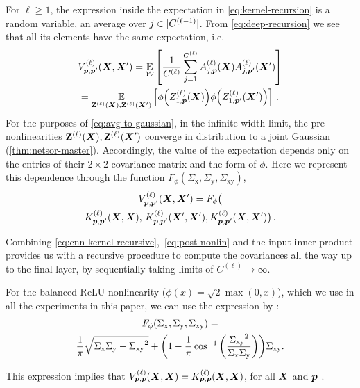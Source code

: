 \documentclass[accepted]{uai2021} %
\newcommand{\Sigmax}{{\Sigma_{\text{x}}}}
\newcommand{\Sigmay}{{\Sigma_{\text{y}}}}
\newcommand{\Sigmaxy}{{\Sigma_{\text{xy}}}}
\newcommand{\layerAd}[2]{\mathbf{Z}^{(#1)}_{#2}(\vX')}
\newcommand{\layerAsd}[2]{Z^{(#1)}_{#2}(\vX')}
\newcommand{\layerAs}[2]{Z^{(#1)}_{#2}(\vX)}
\newcommand{\layerA}[2]{\mathbf{Z}^{(#1)}_{#2}(\mX)}
\newcommand{\layerC}[1]{C^{(#1)}}
\newcommand{\layerNLAsd}[2]{A^{(#1)}_{#2}(\vX')}
\newcommand{\layerNLAs}[2]{A^{(#1)}_{#2}(\vX)}
\newcommand{\prevchan}{j}   %
\newcommand{\patch}{\vp}               %
\newcommand{\covf}[1]{K\ssup{#1}}
\newcommand{\nlinf}[1]{V\ssup{#1}}
\newcommand{\0}{\boldsymbol{0}}
\newcommand{\1}{\boldsymbol{1}}
\newcommand{\crefp}[1]{(\cref{#1})}
\begin{document}
For $\ell\ge 1$, the expression inside the expectation in \cref{eq:kernel-recursion} is a random variable, an average over $\prevchan\in\countto{\layerC{\ell-1}}$. From \cref{eq:deep-recursion} we see that all its elements have the same expectation, i.e.
\begin{multline}
\nlinf{\ell}_{\patch,\patch'}\bra{\mX,\mX'}
= \Expect{\gW}{\frac{1}{\layerC{\ell}} \sum_{\prevchan=1}^{\layerC{\ell}} \layerNLAs{\ell}{\prevchan,\patch} \layerNLAsd{\ell}{\prevchan,\patch'}} \\
= \Expect{ \layerA{\ell}{}, \layerAd{\ell}{} }{\phi\bra{\layerAs{\ell}{1,\patch}} \phi\bra{\layerAsd{\ell}{1,\patch'}}}\,.
\label{eq:avg-to-gaussian}
\end{multline}
For the purposes of \cref{eq:avg-to-gaussian}, in the infinite width limit, the
pre-nonlinearities $\layerA{\ell}{},\layerAd{\ell}{}$ converge in distribution to a joint Gaussian
\crefp{thm:netsor-master}. Accordingly, the value of the expectation depends only on the entries of their $2\times 2$ covariance matrix and the form of $\phi$. Here we represent this dependence through the function $F_{\phi}(\Sigmax, \Sigmay, \Sigmaxy)$,
\begin{multline}
\nlinf{\ell}_{\patch,\patch'}\bra{\mX,\mX'}
=F_{\phi}\big(\\
\covf{\ell}_{\patch,\patch'}\bra{\mX, \mX},\,\covf{\ell}_{\patch,\patch'}\bra{\mX', \mX'},
\covf{\ell}_{\patch,\patch'}\bra{\mX, \mX'}\big)\,.
\label{eq:post-nonlin}
\end{multline}

Combining \cref{eq:cnn-kernel-recursive},~\ref{eq:post-nonlin} and the input inner product
provides us with a recursive procedure to compute the covariances all the way up to the final layer, by sequentially taking limits of $\layerC\ell\to\infty$. %

For the balanced ReLU nonlinearity ($\phi(x) = \sqrt{2}\max(0, x)$), which we
use in all the experiments in this paper, we can use the expression by \citet{cho2009mkm}:
\begin{multline}
  F_{\phi}\bra{\Sigmax, \Sigmay, \Sigmaxy} = \\\frac{1}{\pi} \sqrt{\Sigmax\Sigmay - \Sigmaxy^{2}} + \bra{1 - \frac{1}{\pi}\cos^{-1}\bra{\frac{\Sigmaxy^{2}}{\Sigmax\Sigmay}}} \Sigmaxy.
\end{multline}

This expression implies that
$\nlinf{\ell}_{\patch,\patch}\bra{\mX,\mX} = \covf{\ell}_{\patch,\patch}\bra{\mX,\mX}$,
for all ${\bm{X}}$ and $\patch$ \citep{lee2018dnnlimit,matthews2018dnnlimit}.
\end{document}
